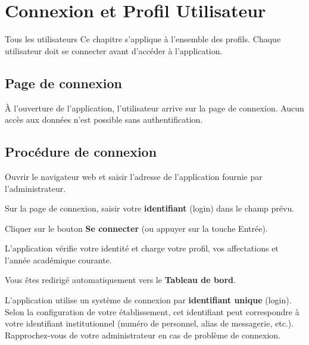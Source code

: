 \chapter{Connexion et Profil Utilisateur}
\label{chap:connexion}

\begin{rolebox}{Tous les utilisateurs}
  Ce chapitre s'applique \`a l'ensemble des profils. Chaque utilisateur doit se connecter avant d'acc\'eder \`a l'application.
\end{rolebox}

\section{Page de connexion}

\`A l'ouverture de l'application, l'utilisateur arrive sur la page de connexion. Aucun acc\`es aux donn\'ees n'est possible sans authentification.


\section{Proc\'edure de connexion}

\begin{steps}
  \item Ouvrir le navigateur web et saisir l'adresse de l'application fournie par l'administrateur.
  \item Sur la page de connexion, saisir votre \textbf{identifiant} (login) dans le champ pr\'evu.
  \item Cliquer sur le bouton \textbf{Se connecter} (ou appuyer sur la touche \textsf{Entr\'ee}).
  \item L'application v\'erifie votre identit\'e et charge votre profil, vos affectations et l'ann\'ee acad\'emique courante.
  \item Vous \^etes redirig\'e automatiquement vers le \textbf{Tableau de bord}.
\end{steps}

\begin{notebox}
  L'application utilise un syst\`eme de connexion par \textbf{identifiant unique} (login). Selon la configuration de votre \'etablissement, cet identifiant peut correspondre \`a votre identifiant institutionnel (num\'ero de personnel, alias de messagerie, etc.). Rapprochez-vous de votre administrateur en cas de probl\`eme de connexion.
\end{notebox}

